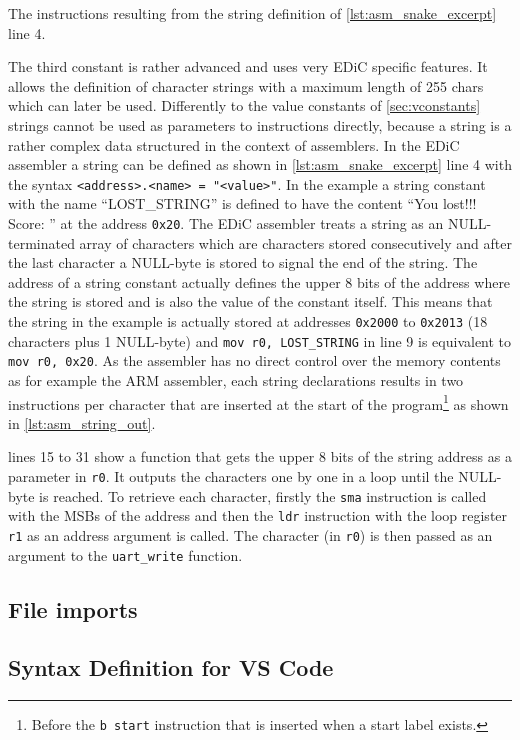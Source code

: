 \begin{listing}
  \caption{The instructions resulting from the string definition of \cref{lst:asm_snake_excerpt} line 4.}
  \label{lst:asm_string_out}
\end{listing}
The third constant is rather advanced and uses very \gls{EDiC} specific features.
It allows the definition of character strings with a maximum length of 255 chars which can later be used.
Differently to the value constants of \cref{sec:vconstants} strings cannot be used as parameters to instructions directly, because a string is a rather complex data structured in the context of assemblers.
In the \gls{EDiC} assembler a string can be defined as shown in \cref{lst:asm_snake_excerpt} line 4 with the syntax \texttt{<address>.<name> = "<value>"}.
In the example a string constant with the name ``LOST\_STRING'' is defined to have the content ``You lost!!! Score: '' at the address \texttt{0x20}.
The \gls{EDiC} assembler treats a string as an NULL-terminated array of characters which are characters stored consecutively and after the last character a NULL-byte is stored to signal the end of the string.
The address of a string constant actually defines the upper 8 bits of the address where the string is stored and is also the value of the constant itself.
This means that the string in the example is actually stored at addresses \texttt{0x2000} to \texttt{0x2013} (18 characters plus 1 NULL-byte) and \texttt{mov r0, LOST_STRING} in line 9 is equivalent to \texttt{mov r0, 0x20}.
As the assembler has no direct control over the memory contents as for example the ARM assembler, each string declarations results in two instructions per character that are inserted at the start of the program\footnote{Before the \texttt{b start} instruction that is inserted when a start label exists.} as shown in \cref{lst:asm_string_out}.

 lines 15 to 31 show a function that gets the upper 8 bits of the string address as a parameter in \texttt{r0}.
It outputs the characters one by one in a loop until the NULL-byte is reached.
To retrieve each character, firstly the \texttt{sma} instruction is called with the \glspl{MSB} of the address and then the \texttt{ldr} instruction with the loop register \texttt{r1} as an address argument is called.
The character (in \texttt{r0}) is then passed as an argument to the \texttt{uart\_write} function.

\subsection{File imports}\label{sec:imports}



\subsection{Syntax Definition for VS Code}